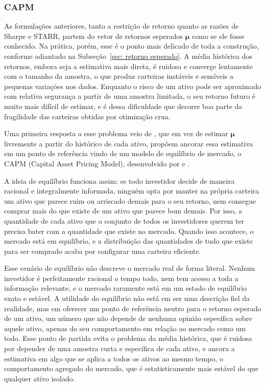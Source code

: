 \documentclass[12pt,a4paper]{article}
\begin{document}
\subsubsection{CAPM}
\label{sec: CAPM}
As formulações anteriores, tanto a restrição de retorno quanto as razões de Sharpe e STARR, partem do vetor de retornos esperados $\boldsymbol{\mu}$ como se ele fosse conhecido. Na prática, porém, esse é o ponto mais delicado de toda a construção, conforme adiantado na Subseção~\ref{sec: retorno esperado}. A média histórica dos retornos, embora seja a estimativa mais direta, é ruidosa e converge lentamente com o tamanho da amostra, o que produz carteiras instáveis e sensíveis a pequenas variações nos dados. Enquanto o risco de um ativo pode ser aproximado com relativa segurança a partir de uma amostra limitada, o seu retorno futuro é muito mais difícil de estimar, e é dessa dificuldade que decorre boa parte da fragilidade das carteiras obtidas por otimização crua.

Uma primeira resposta a esse problema veio de , que em vez de estimar $\boldsymbol{\mu}$ livremente a partir do histórico de cada ativo, propõem ancorar essa estimativa em um ponto de referência vindo de um modelo de equilíbrio de mercado, o CAPM (Capital Asset Pricing Model), desenvolvido por  e .

A ideia de equilíbrio funciona assim: se todo investidor decide de maneira racional e integralmente informada, ninguém opta por manter na própria carteira um ativo que parece ruim ou arriscado demais para o seu retorno, nem consegue comprar mais do que existe de um ativo que parece bom demais. Por isso, a quantidade de cada ativo que o conjunto de todos os investidores querem ter precisa bater com a quantidade que existe no mercado. Quando isso acontece, o mercado está em equilíbrio, e a distribuição das quantidades de tudo que existe para ser comprado acaba por configurar uma carteira eficiente.

Esse cenário de equilíbrio não descreve o mercado real de forma literal. Nenhum investidor é perfeitamente racional o tempo todo, nem tem acesso a toda a informação relevante, e o mercado raramente está em um estado de equilíbrio exato e estável. A utilidade do equilíbrio não está em ser uma descrição fiel da realidade, mas em oferecer um ponto de referência neutro para o retorno esperado de um ativo, um número que não depende de nenhuma opinião específica sobre aquele ativo, apenas do seu comportamento em relação ao mercado como um todo. Esse ponto de partida evita o problema da média histórica, que é ruidosa por depender de uma amostra curta e específica de cada ativo, e ancora a estimativa em algo que se aplica a todos os ativos ao mesmo tempo, o comportamento agregado do mercado, que é estatisticamente mais estável do que qualquer ativo isolado.
\end{document}
